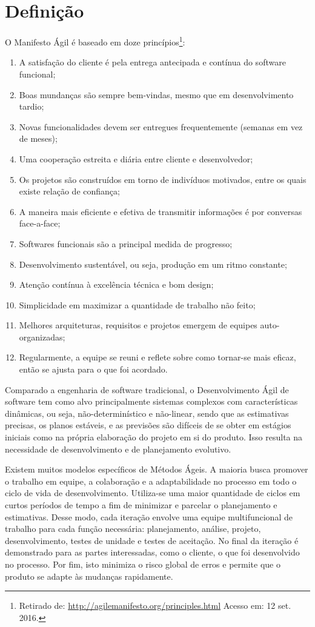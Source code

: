 \section{Definição}
\par O Manifesto Ágil é baseado em doze princípios\footnote{Retirado de: \url{http://agilemanifesto.org/principles.html} Acesso em: 12 set. 2016.}:
\begin{enumerate}
  \item A satisfação do cliente é pela entrega antecipada e contínua do software funcional;
  \item Boas mundanças são sempre bem-vindas, mesmo que em desenvolvimento tardio;
  \item Novas funcionalidades devem ser entregues frequentemente (semanas em vez de meses);
  \item Uma cooperação estreita e diária entre cliente e desenvolvedor;
  \item Os projetos são construídos em torno de indivíduos motivados, entre os quais existe relação de confiança;
  \item A maneira mais eficiente e efetiva de transmitir informações é por conversas face-a-face;
  \item Softwares funcionais são a principal medida de progresso;
  \item Desenvolvimento sustentável, ou seja, produção em um ritmo constante;
  \item Atenção contínua à excelência técnica e bom design;
  \item Simplicidade em maximizar a quantidade de trabalho não feito;
  \item Melhores arquiteturas, requisitos e projetos emergem de equipes auto-organizadas;
  \item Regularmente, a equipe se reuni e reflete sobre como tornar-se mais eficaz, então se ajusta para o que foi acordado.
\end{enumerate}
\par Comparado a engenharia de software tradicional, o Desenvolvimento Ágil de software tem como alvo principalmente sistemas complexos com características dinâmicas, ou seja, não-determinístico e não-linear, sendo que as estimativas precisas, os planos estáveis, e as previsões são difíceis de se obter em estágios iniciais como na própria elaboração do projeto em si do produto. Isso resulta na necessidade de desenvolvimento e de planejamento evolutivo. \citep{Craig:04}
\par Existem muitos modelos específicos de Métodos Ágeis. A maioria busca promover o trabalho em equipe, a colaboração e a adaptabilidade no processo em todo o ciclo de vida de desenvolvimento. Utiliza-se uma maior quantidade de ciclos em curtos períodos de tempo a fim de minimizar e parcelar o planejamento e estimativas. Desse modo, cada iteração envolve uma equipe multifuncional de trabalho para cada função necessária: planejamento, análise, projeto, desenvolvimento, testes de unidade e testes de aceitação. No final da iteração é demonstrado para as partes interessadas, como o cliente, o que foi desenvolvido no processo. Por fim, isto minimiza o risco global de erros e permite que o produto se adapte às mudanças rapidamente.
